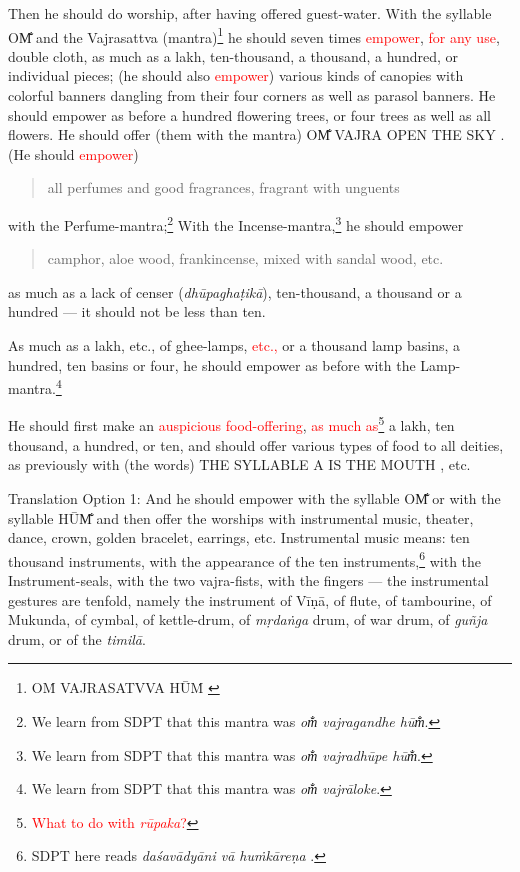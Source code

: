 \documentclass[11pt]{book}
\makeatletter
\def\fakesc#1{%
  \begingroup%
  \xdef\fake@name{\csname\curr@fontshape/\f@size\endcsname}%
  \fontsize{1.3\fontdimen8\fake@name}{\baselineskip}\selectfont%
  \uppercase{#1}%
  \endgroup%
}
\newcommand{\mantra}[1]{\fakesc{#1}}
\newcommand{\red}[1]{\textcolor{red}{#1}}
\newcommand{\skt}[1]{\emph{#1}}
\makeatother
\begin{document}
Then he should do worship, after having offered guest-water. With the syllable \mantra{om̐} and the Vajrasattva (mantra)\footnote{\mantra{Oṁ Vajrasatvva Hūṁ}} he should seven times \red{empower},  \red{for any use}, double cloth, as much as a lakh, ten-thousand, a thousand, a hundred, or individual pieces; (he should also \red{empower}) various kinds of canopies with colorful banners dangling from their four corners as well as parasol banners. He should empower as before a hundred flowering trees, or four trees as well as all flowers. He should offer (them with the mantra) \mantra{om̐ vajra open the sky}. (He should \red{empower})

\begin{verse}
all perfumes and good fragrances, fragrant with unguents
\end{verse}

with the Perfume-mantra;\footnote{We learn from SDPT that this mantra was \skt{om̐ vajragandhe hūm̐}.} With the Incense-mantra,\footnote{We learn from SDPT that this mantra was \skt{om̐ vajradhūpe hūm̐}.} he should empower 

\begin{verse}
camphor, aloe wood, frankincense, mixed with sandal wood, etc.
\end{verse}

as much as a lack of censer (\skt{dhūpaghaṭikā}), ten-thousand, a thousand or a hundred — it should not be less than ten.

As much as a lakh, etc., of ghee-lamps, \red{etc.,}%
or a thousand lamp basins, a hundred, ten basins or four, he should empower as before with the Lamp-mantra.\footnote{We learn from SDPT that this mantra was \skt{om̐ vajrāloke}.}

He should first make an \red{auspicious food-offering}, \red{as much as}\footnote{\red{What to do with \skt{rūpaka}?}} a lakh, ten thousand, a hundred, or ten, and should offer various types of food to all deities, as previously with (the words) \mantra{the syllable a is the mouth}, etc.

Translation Option 1:
	And he should empower with the syllable \mantra{om̐} or with the syllable \mantra{hūm̐} and then offer the worships with instrumental music, theater, dance, crown, golden bracelet, earrings, etc. Instrumental music means: ten thousand instruments, with the appearance of the ten instruments,\footnote{SDPT here reads \skt{daśavādyāni vā huṁkāreṇa }.} with the Instrument-seals, with the two vajra-fists, with the fingers — the instrumental gestures are tenfold, namely the instrument of Vīṇā, of flute, of tambourine, of Mukunda, of cymbal, of kettle-drum, of \skt{mṛdaṅga} drum, of war drum, of \skt{guñja} drum, or of the \skt{timilā}.
\end{document}

